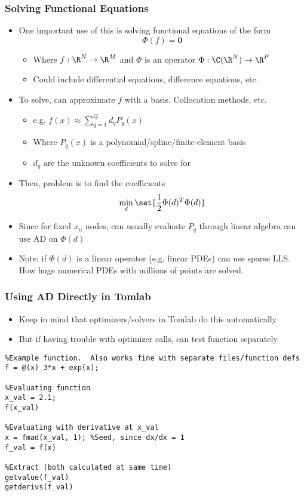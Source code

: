 \documentclass[nofootline]{etk-presentation}
\begin{document}
\begin{frame}[fragile]	\frametitle{Solving Functional Equations}
	\begin{itemize}
\item	One important use of this is solving functional equations of the form
	$$\Phi(f) = \mathbf{0}$$
	\begin{itemize}
		\item Where $f : \R^N \to \R^M$ and $\Phi$ is an operator $\Phi : \C(\R^N) \to \R^P$
		\item Could include differential equations, difference equations, etc.
	\end{itemize}
\item To solve, can approximate $f$ with a basis.  Collocation methods, etc.
\begin{itemize}
	\item e.g. $f(x) \approx \sum_{q=1}^{Q}d_q P_q(x)$
	\item Where $P_q(x)$ is a polynomial/spline/finite-element basis
	\item $d_q$ are the unknown coefficients to solve for
\end{itemize}
\item Then, problem is to find the coefficients
$$
\min_{d} \set{\frac{1}{2}\Phi(d)^T \Phi(d)}
$$
\item Since for fixed $x_n$ nodes, can usually evaluate $P_q$ through linear algebra can use AD on $\Phi(d)$
\item Note: if $\Phi(d)$ is a linear operator (e.g. linear PDEs) can use sparse LLS.  How huge numerical PDEs with millions of points are solved.
\end{itemize}
\end{frame}		

\begin{frame}\frametitle{}
	\bigskip
	\bigskip
	\bigskip	
	\begin{center}
		{\huge {}}
	\end{center}
 \end{frame}

\begin{frame}[fragile] \frametitle{Using AD Directly in Tomlab}
	\begin{itemize}
	\item Keep in mind that optimizers/solvers in Tomlab do this automatically
	\item But if having trouble with optimizer calls, can test function separately
	\end{itemize}
\begin{verbatim}
%Example function.  Also works fine with separate files/function defs
f = @(x) 3*x + exp(x);

%Evaluating function
x_val = 2.1;
f(x_val)

%Evaluating with derivative at x_val
x = fmad(x_val, 1); %Seed, since dx/dx = 1
f_val = f(x)

%Extract (both calculated at same time)
getvalue(f_val)
getderivs(f_val)
\end{verbatim}

\end{frame}
\end{document}
